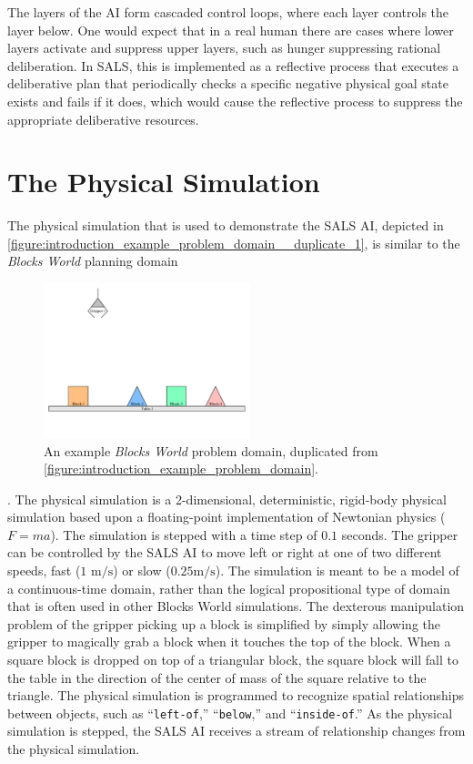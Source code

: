 The layers of the AI form cascaded control loops, where each layer
controls the layer below.  One would expect that in a real human there
are cases where lower layers activate and suppress upper layers, such
as hunger suppressing rational deliberation.  In SALS, this is
implemented as a reflective process that executes a deliberative plan
that periodically checks a specific negative physical goal state
exists and fails if it does, which would cause the reflective process
to suppress the appropriate deliberative resources.

\section{The Physical Simulation}

The physical simulation that is used to demonstrate the SALS AI,
depicted in
{\autoref{figure:introduction_example_problem_domain__duplicate_1}},
is similar to the {\emph{Blocks World}} planning domain
\begin{figure}
\includegraphics[width=6cm]{gfx/blocks_world_large-01}
  \caption[An example {\emph{Blocks World}} problem domain.]{An
    example {\emph{Blocks World}} problem domain, duplicated from
    {\mbox{\autoref{figure:introduction_example_problem_domain}}}.}
  \label{figure:introduction_example_problem_domain__duplicate_1}
\end{figure}
{\cite[]{winograd:1970}}.  The physical simulation is a 2-dimensional,
deterministic, rigid-body physical simulation based upon a
floating-point implementation of Newtonian physics ($F=ma$).  The
simulation is stepped with a time step of $0.1$ seconds.  The gripper
can be controlled by the SALS AI to move left or right at one of two
different speeds, fast ($1\text{ m}/\text{s}$) or slow ($0.25\text{
  m}/\text{s}$).  The simulation is meant to be a model of a
continuous-time domain, rather than the logical propositional type of
domain that is often used in other Blocks World simulations.  The
dexterous manipulation problem of the gripper picking up a block is
simplified by simply allowing the gripper to magically grab a block
when it touches the top of the block.  When a square block is dropped
on top of a triangular block, the square block will fall to the table
in the direction of the center of mass of the square relative to the
triangle.  The physical simulation is programmed to recognize spatial
relationships between objects, such as ``{\tt{left-of}},''
``{\tt{below}},'' and ``{\tt{inside-of}}.''  As the physical
simulation is stepped, the SALS AI receives a stream of relationship
changes from the physical simulation.

